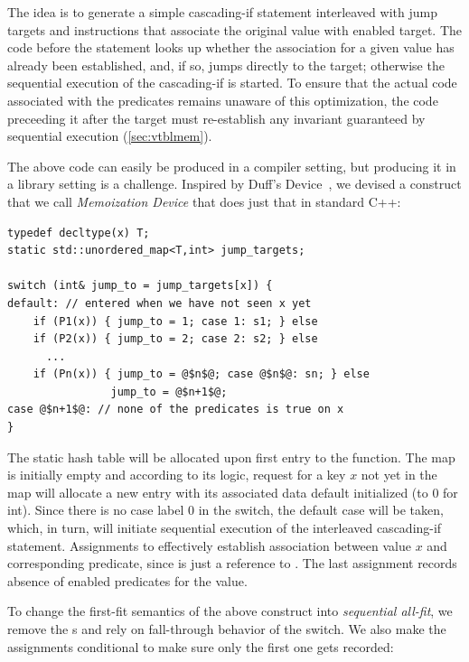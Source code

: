 The idea is to generate a simple cascading-if statement interleaved with jump 
targets and instructions that associate the original value with enabled target. 
The code before the statement looks up whether the association for a given value 
has already been established, and, if so, jumps directly to the target; otherwise 
the sequential execution of the cascading-if is started. To ensure 
that the actual code associated with the predicates remains unaware of this 
optimization, the code preceeding it after the target must re-establish any 
invariant guaranteed by sequential execution (\textsection\ref{sec:vtblmem}).

The above code can easily be produced in a compiler setting, but producing it in 
a library setting is a challenge. Inspired by Duff's Device~\cite{Duff}, 
we devised a construct that we call \emph{Memoization Device} that does just 
that in standard C++:

\begin{lstlisting}
typedef decltype(x) T;
static std::unordered_map<T,int> jump_targets;

switch (int& jump_to = jump_targets[x]) {
default: // entered when we have not seen x yet
    if (P1(x)) { jump_to = 1; case 1: s1; } else 
    if (P2(x)) { jump_to = 2; case 2: s2; } else
      ...
    if (Pn(x)) { jump_to = @$n$@; case @$n$@: sn; } else
                jump_to = @$n+1$@;
case @$n+1$@: // none of the predicates is true on x
}
\end{lstlisting}

\noindent
The static  hash table will be allocated upon first entry 
to the function. The map is initially empty and according to its logic, 
request for a key $x$ not yet in the map will allocate a 
new entry with its associated data default initialized (to 0 for int). Since 
there is no case label 0 in the switch, the default case will be taken, which, in 
turn, will initiate sequential execution of the interleaved cascading-if 
statement. Assignments to  effectively establish association 
between value $x$ and corresponding predicate, since  is just a 
reference to . The last assignment records absence of 
enabled predicates for the value.

To change the first-fit semantics of the above construct into \emph{sequential 
all-fit}, we remove the s and rely on fall-through behavior of the 
switch. We also make the assignments conditional to make sure only the first one 
gets recorded:

